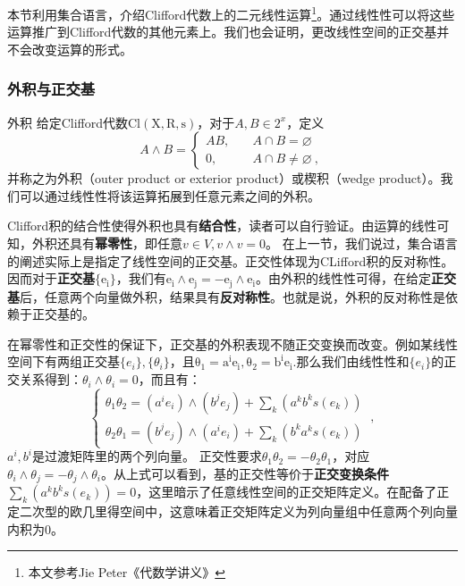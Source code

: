 



本节利用集合语言，介绍Clifford代数上的二元线性运算\footnote{本文参考Jie Peter《代数学讲义》}。通过线性性可以将这些运算推广到Clifford代数的其他元素上。我们也会证明，更改线性空间的正交基并不会改变运算的形式。
\subsubsection{外积与正交基}
\begin{definition}{外积}
给定Clifford代数$\mathrm {Cl(X,R,s)}$，对于$A,B\in 2^x$，定义
\begin{equation}
A \wedge B=\left\{\begin{aligned}
A B,\quad& A \cap B=\varnothing \\
0,\quad& A \cap B \neq \varnothing~,
\end{aligned}\right.
\end{equation}
并称之为外积（outer product or exterior product）或楔积（wedge product）。我们可以通过线性性将该运算拓展到任意元素之间的外积。
\end{definition}


Clifford积的结合性使得外积也具有\textbf{结合性}，读者可以自行验证。由运算的线性可知，外积还具有\textbf{幂零性}，即任意$v\in V,v\wedge v=0$。
在上一节，我们说过，集合语言的阐述实际上是指定了线性空间的正交基。正交性体现为CLifford积的反对称性。因而对于\textbf{正交基}$\{\mathrm {e_i}\}$，我们有$\mathrm{e_i\wedge e_j=-e_j\wedge e_i}$。由外积的线性性可得，在给定\textbf{正交基}后，任意两个向量做外积，结果具有\textbf{反对称性}。也就是说，外积的反对称性是依赖于正交基的。


在幂零性和正交性的保证下，正交基的外积表现不随正交变换而改变。例如某线性空间下有两组正交基$\{e_i\},\{\theta_i\}$，且$\mathrm {\theta_1=a^i e_i,\theta_2=b^i e_i}$.那么我们由线性性和$\{e_i\}$的正交关系得到：$\theta_i\wedge\theta_i=0$，而且有：
\begin{equation}
\left\{\begin{array}{l}
\theta_1 \theta_2=\left(a^i e_i\right) \wedge\left(b^j e_j\right)+\sum_k\left(a^k b^k s(e_k)\right) \\
\theta_2 \theta_1=\left(b^j e_j\right) \wedge\left(a^i e_i\right)+\sum_k\left(b^k a^k s(e_k)\right)
\end{array}\right.~,
\end{equation}
$a^i,b^i$是过渡矩阵里的两个列向量。
正交性要求$\theta_1\theta_2=-\theta_2\theta_1$，对应$\theta_i\wedge\theta_j=-\theta_j\wedge\theta_i$。从上式可以看到，基的正交性等价于\textbf{正交变换条件}$\sum_k(a^k b^k s(e_k))=0$，这里暗示了任意线性空间的正交矩阵定义。在配备了正定二次型的欧几里得空间中，这意味着正交矩阵定义为列向量组中任意两个列向量内积为$0$。
